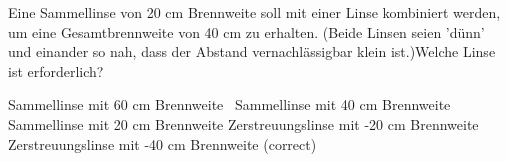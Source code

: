 \documentclass[11pt]{exam}
\begin{document}
\begin{questions}
\vspace{3mm}\question Eine Sammellinse von 20 cm Brennweite soll mit einer Linse kombiniert werden, um eine Gesamtbrennweite von 40 cm zu erhalten. (Beide Linsen seien ’dünn’ und einander so nah, dass der Abstand vernachlässigbar klein ist.)Welche Linse ist erforderlich?

\begin{choices}
	\choice Sammellinse mit 60 cm Brennweite
	\choice  Sammellinse mit 40 cm Brennweite
	\choice Sammellinse mit 20 cm Brennweite
	\choice Zerstreuungslinse mit -20 cm Brennweite
	\choice Zerstreuungslinse mit -40 cm Brennweite (correct)
\end{choices}

\vspace{3mm}\end{questions}
\end{document}
